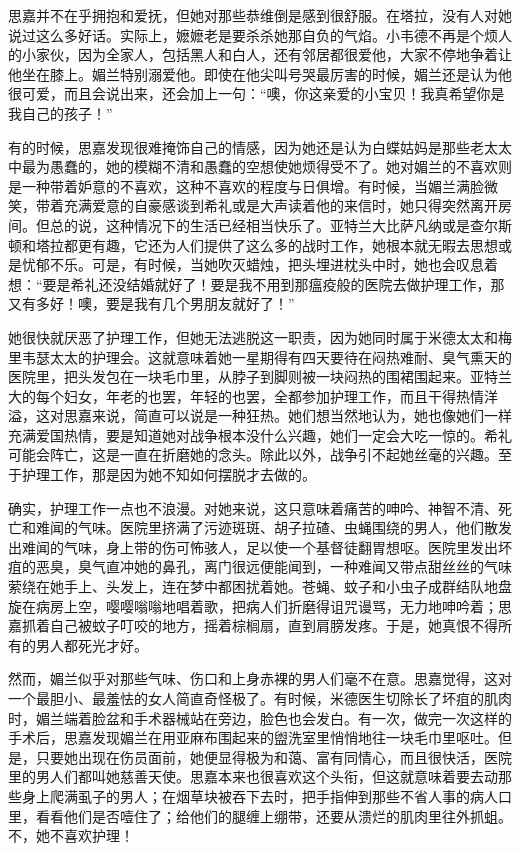 \par 思嘉并不在乎拥抱和爱抚，但她对那些恭维倒是感到很舒服。在塔拉，没有人对她说过这么多好话。实际上，嬷嬷老是要杀杀她那自负的气焰。小韦德不再是个烦人的小家伙，因为全家人，包括黑人和白人，还有邻居都很爱他，大家不停地争着让他坐在膝上。媚兰特别溺爱他。即使在他尖叫号哭最厉害的时候，媚兰还是认为他很可爱，而且会说出来，还会加上一句：“噢，你这亲爱的小宝贝！我真希望你是我自己的孩子！”
\par 有的时候，思嘉发现很难掩饰自己的情感，因为她还是认为白蝶姑妈是那些老太太中最为愚蠢的，她的模糊不清和愚蠢的空想使她烦得受不了。她对媚兰的不喜欢则是一种带着妒意的不喜欢，这种不喜欢的程度与日俱增。有时候，当媚兰满脸微笑，带着充满爱意的自豪感谈到希礼或是大声读着他的来信时，她只得突然离开房间。但总的说，这种情况下的生活已经相当快乐了。亚特兰大比萨凡纳或是查尔斯顿和塔拉都更有趣，它还为人们提供了这么多的战时工作，她根本就无暇去思想或是忧郁不乐。可是，有时候，当她吹灭蜡烛，把头埋进枕头中时，她也会叹息着想：“要是希礼还没结婚就好了！要是我不用到那瘟疫般的医院去做护理工作，那又有多好！噢，要是我有几个男朋友就好了！”
\par 她很快就厌恶了护理工作，但她无法逃脱这一职责，因为她同时属于米德太太和梅里韦瑟太太的护理会。这就意味着她一星期得有四天要待在闷热难耐、臭气熏天的医院里，把头发包在一块毛巾里，从脖子到脚则被一块闷热的围裙围起来。亚特兰大的每个妇女，年老的也罢，年轻的也罢，全都参加护理工作，而且干得热情洋溢，这对思嘉来说，简直可以说是一种狂热。她们想当然地认为，她也像她们一样充满爱国热情，要是知道她对战争根本没什么兴趣，她们一定会大吃一惊的。希礼可能会阵亡，这是一直在折磨她的念头。除此以外，战争引不起她丝毫的兴趣。至于护理工作，那是因为她不知如何摆脱才去做的。
\par 确实，护理工作一点也不浪漫。对她来说，这只意味着痛苦的呻吟、神智不清、死亡和难闻的气味。医院里挤满了污迹斑斑、胡子拉碴、虫蝇围绕的男人，他们散发出难闻的气味，身上带的伤可怖骇人，足以使一个基督徒翻胃想呕。医院里发出坏疽的恶臭，臭气直冲她的鼻孔，离门很远便能闻到，一种难闻又带点甜丝丝的气味萦绕在她手上、头发上，连在梦中都困扰着她。苍蝇、蚊子和小虫子成群结队地盘旋在病房上空，嘤嘤嗡嗡地唱着歌，把病人们折磨得诅咒谩骂，无力地呻吟着；思嘉抓着自己被蚊子叮咬的地方，摇着棕榈扇，直到肩膀发疼。于是，她真恨不得所有的男人都死光才好。
\par 然而，媚兰似乎对那些气味、伤口和上身赤裸的男人们毫不在意。思嘉觉得，这对一个最胆小、最羞怯的女人简直奇怪极了。有时候，米德医生切除长了坏疽的肌肉时，媚兰端着脸盆和手术器械站在旁边，脸色也会发白。有一次，做完一次这样的手术后，思嘉发现媚兰在用亚麻布围起来的盥洗室里悄悄地往一块毛巾里呕吐。但是，只要她出现在伤员面前，她便显得极为和蔼、富有同情心，而且很快活，医院里的男人们都叫她慈善天使。思嘉本来也很喜欢这个头衔，但这就意味着要去动那些身上爬满虱子的男人；在烟草块被吞下去时，把手指伸到那些不省人事的病人口里，看看他们是否噎住了；给他们的腿缠上绷带，还要从溃烂的肌肉里往外抓蛆。不，她不喜欢护理！
